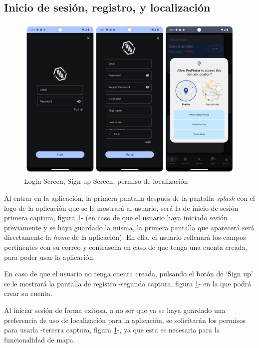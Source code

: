 \subsection{Inicio de sesión, registro, y localización}
\begin{figure}[h]
	\centering
	\includegraphics[width = 1\textwidth]{Imagenes/capturasApp/login_signup_local.png}
	\caption{Login Screen, Sign up Screen, permiso de localización}
	\label{fig:capApp1}
\end{figure}
Al entrar en la aplicación, la primera pantalla después de la pantalla \textit{splash} con el logo de la aplicación que se le mostrará al usuario, será la de inicio de sesión -primera captura, figura \ref{fig:capApp1}- (en caso de que el usuario haya iniciado sesión previamente y se haya guardado la misma, la primera pantalla que aparecerá será directamente la \textit{home} de la aplicación). En ella, el usuario rellenará los campos pertinentes con su correo y contraseña en caso de que tenga una cuenta creada, para poder usar la aplicación.

En caso de que el usuario no tenga cuenta creada, pulsando el botón de ‘Sign up’ se le mostrará la pantalla de registro -segunda captura, figura \ref{fig:capApp1}- en la que podrá crear su cuenta.

Al iniciar sesión de forma exitosa, a no ser que ya se haya guardado una preferencia de uso de localización para la aplicación, se solicitarán los permisos para usarla -tercera captura, figura \ref{fig:capApp1}-, ya que esta es necesaria para la funcionalidad de mapa.
\newpage
